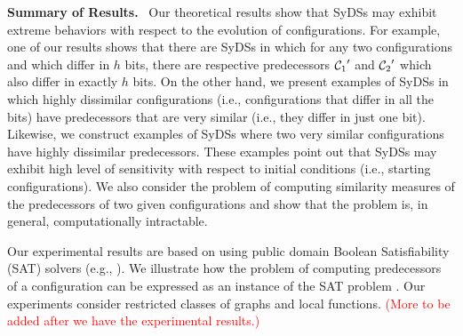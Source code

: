 \noindent
\textbf{Summary of Results.}~ 
Our theoretical results show that SyDSs may exhibit
extreme behaviors with respect to the evolution of configurations.
For example, one of our results shows that there are SyDSs in which
for any two configurations \calcone{} and \calctwo{} 
which differ in $h$ bits, there are respective predecessors 
$\mbox{$\mathcal{C}_{1}$}'$ and $\mbox{$\mathcal{C}_{2}$}'$ which also differ in exactly $h$ bits.
On the other hand, we present examples of SyDSs in which
highly dissimilar configurations (i.e., configurations that differ
in all the bits) have predecessors that are very similar (i.e., they
differ in just one bit).
Likewise, we construct examples of SyDSs where two very similar 
configurations have highly dissimilar predecessors.
These examples point out that SyDSs may exhibit high level of sensitivity
with respect to initial conditions (i.e., starting configurations).
We also consider the problem of computing similarity
measures of the predecessors of two given configurations and show that
the problem is, in general, computationally intractable.

Our experimental results are based on using public domain Boolean Satisfiability
(SAT) solvers (e.g., \cite{sat-live}).
We illustrate how the problem of computing predecessors of a
configuration can be expressed as an instance of the SAT
problem \cite{GJ-1979}.
Our experiments consider restricted classes of graphs and local functions.
\textcolor{red}{(More to be added after we have the experimental results.)}

\smallskip

